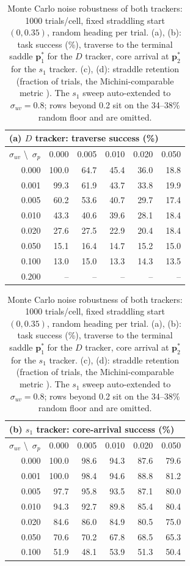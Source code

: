 \documentclass[lettersize,journal]{IEEEtran}
\begin{document}
\begin{table}[!t]
\centering
\caption{Monte Carlo noise robustness of both trackers: 1000
trials/cell, fixed straddling start $(0, 0.35)$, random heading per
trial. (a), (b): task success (\%), traverse to the terminal saddle
$\mathbf{p}^*_1$ for the $D$ tracker, core arrival at
$\mathbf{p}^*_2$ for the $s_1$ tracker. (c), (d): straddle retention
(fraction of trials, the Michini-comparable metric \cite{9}). The $s_1$
sweep auto-extended to $\sigma_{uv} = 0.8$; rows beyond 0.2 sit on the
34--38\% random floor and are omitted.}
\label{tab:mc_success}
\footnotesize
\setlength{\tabcolsep}{4pt}
\begin{tabular}{r|rrrrr}
\multicolumn{6}{l}{(a) $D$ tracker: traverse success (\%)} \\
\hline
$\sigma_{uv}$ \textbackslash\ $\sigma_p$ & 0.000 & 0.005 & 0.010 & 0.020 & 0.050 \\
\hline
0.000 & 100.0 & 64.7 & 45.4 & 36.0 & 18.8 \\
0.001 &  99.3 & 61.9 & 43.7 & 33.8 & 19.9 \\
0.005 &  60.2 & 53.6 & 40.7 & 29.7 & 17.4 \\
0.010 &  43.3 & 40.6 & 39.6 & 28.1 & 18.4 \\
0.020 &  27.6 & 27.5 & 22.9 & 20.4 & 18.4 \\
0.050 &  15.1 & 16.4 & 14.7 & 15.2 & 15.0 \\
0.100 &  13.0 & 15.0 & 13.3 & 14.3 & 13.5 \\
0.200 &  --   & --   & --   & --   & --   \\
\hline
\end{tabular}
\hspace{1.5em}
\begin{tabular}{r|rrrrr}
\multicolumn{6}{l}{(b) $s_1$ tracker: core-arrival success (\%)} \\
\hline
$\sigma_{uv}$ \textbackslash\ $\sigma_p$ & 0.000 & 0.005 & 0.010 & 0.020 & 0.050 \\
\hline
0.000 & 100.0 & 98.6 & 94.3 & 87.6 & 79.6 \\
0.001 & 100.0 & 98.4 & 94.6 & 88.8 & 81.2 \\
0.005 &  97.7 & 95.8 & 93.5 & 87.1 & 80.0 \\
0.010 &  94.3 & 92.7 & 89.8 & 85.4 & 80.4 \\
0.020 &  84.6 & 86.0 & 84.9 & 80.5 & 75.0 \\
0.050 &  70.6 & 70.2 & 67.8 & 68.5 & 65.3 \\
0.100 &  51.9 & 48.1 & 53.9 & 51.3 & 50.4 \\

\end{tabular}
\end{table}
\end{document}
